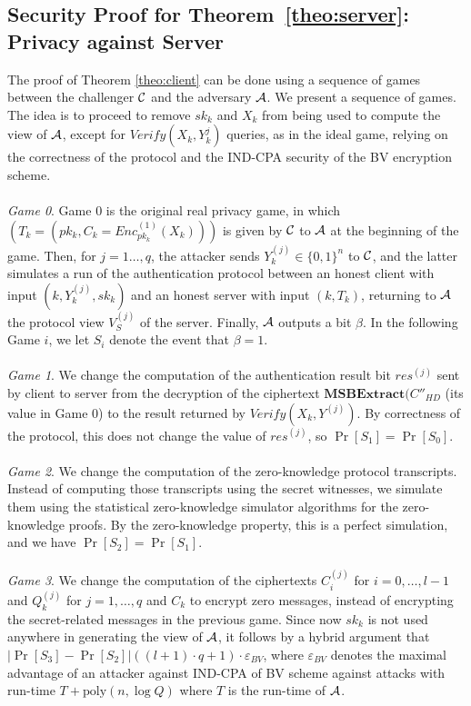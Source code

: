 \subsection{Security Proof for Theorem~\ref{theo:server}: Privacy against Server}
\label{append:ProofsPrivacy}
The proof of Theorem \ref{theo:client} can be done using a sequence of games between the challenger $\mathcal{C}$ and the adversary $\mathcal{A}$. We present a sequence of games. The idea is to proceed to remove $sk_k$ and $X_k$ from being used to compute the view of $\mathcal{A}$, except for $Verify(X_k,Y_k^{j})$ queries, as in the ideal game, relying on the correctness of the protocol and the IND-CPA security of the BV encryption scheme. \\\\
\textit{Game 0}. Game 0 is the original real privacy game, in which $(T_k =(pk_k, C_k = Enc^{(1)}_{pk_k}(X_k)))$ is given by $\mathcal{C}$ to $\mathcal{A}$ at the beginning of the game. Then, for $j=1\ldots,q$, the attacker sends $Y_k^{(j)} \in \{0,1\}^n$ to $\mathcal{C}$, and the latter simulates a run of the authentication protocol between an honest client with input $(k,Y_k^{(j)}, sk_k)$ and an honest server with input $(k,T_k)$, returning to $\mathcal{A}$ the protocol view $V^{(j)}_S$ of the server. Finally, $\mathcal{A}$ outputs a bit $\beta$. In the following Game $i$, we let $S_i$ denote the event that $\beta=1$.\\\\
\textit{Game 1}. We change the computation of the authentication result bit $res^{(j)}$ sent by client to server from the decryption of the ciphertext $\textbf{MSBExtract}(C''_{HD}$ (its value in Game 0) to the result returned by $Verify(X_k, Y^{(j)})$. By correctness of the protocol, this does not change the value of $res^{(j)}$, so $\Pr[S_1] = \Pr[S_0]$. \\\\
\textit{Game 2}. We change the computation of the zero-knowledge protocol transcripts. Instead of computing those transcripts using the secret witnesses, we simulate them using the statistical zero-knowledge simulator algorithms for the zero-knowledge proofs. By the zero-knowledge property, this is a perfect simulation, and we have $\Pr[S_2]= \Pr[S_1]$.\\\\
\textit{Game 3}. We change the computation of the ciphertexts $C^{(j)}_i$ for $i=0,\ldots,l-1$ and $Q^{(j)}_k$ for $j=1,\ldots,q$ and $C_k$ to encrypt zero messages, instead of encrypting the secret-related messages in the previous game. Since now $sk_k$ is not used anywhere in generating the view of $\mathcal{A}$, it follows by a hybrid argument that $|\Pr[S_3]-\Pr[S_2]| ((l+1) \cdot q + 1) \cdot \varepsilon_{BV}$, where $\varepsilon_{BV}$ denotes the maximal advantage of an attacker against IND-CPA of BV scheme against attacks with run-time $T + \mathrm{poly}(n, \log Q)$ where $T$ is the run-time of $\mathcal{A}$.
